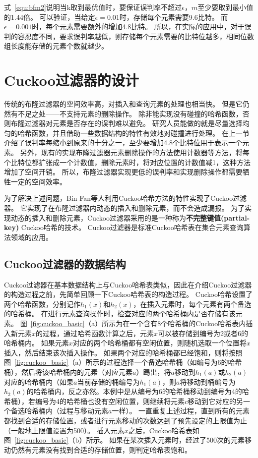 式~\ref{equ:bfm2}说明当k取到最优值时，要保证误判率不超过$\epsilon$，$m$至少要取到最小值的1.44倍。
可以验证，当给定$\epsilon = 0.01$时，存储每个元素需要9.6比特。
而$\epsilon = 0.001 $时，每个元素需要额外的增加4.8比特。
所以，在实际的应用中，对于误判的容忍度不同，要求误判率越低，则存储每个元素需要的比特位越多，相同位数组长度能存储的元素个数就越少。

\section{Cuckoo过滤器的设计}
\label{sec:cbf_para}
传统的布隆过滤器的空间效率高，对插入和查询元素的处理也相当快。
但是它仍然有不足之处——不支持元素的删除操作。
除非能实现没有碰撞的哈希函数，否则布隆过滤器对元素是否存在的误判难以避免。
研究人员能做的就是尽量选择均匀的哈希函数，并且借助一些数据结构的特性有效地对碰撞进行处理。
在上一节介绍了误判率每缩小到原来的十分之一，至少要增加4.8个比特位用于表示一个元素。
另外，现有的实现布隆过滤器元素删除操作的方法使用计数器等方法，将每个比特位都扩张成一个计数值，删除元素时，将对应位置的计数值减1，这种方法增加了空间开销。
所以，布隆过滤器实现更低的误判率和实现删除操作都需要牺牲一定的空间效率。

为了解决上述问题，Bin Fan等人利用Cuckoo哈希方法的特性实现了Cuckoo过滤器\cite{fan2014cuckoo}。
它实现了在布隆过滤器内动态的插入和删除元素，而不会造成漏报。
为了实现动态的插入和删除元素，Cuckoo过滤器采用的是一种称为\textbf{不完整键值(partial-key)} Cuckoo哈希的技术。
Cuckoo过滤器是标准Cuckoo哈希表在集合元素查询算法领域的应用。

\subsection{Cuckoo过滤器的数据结构}

Cuckoo过滤器在基本数据结构上与Cuckoo哈希表类似，因此在介绍Cuckoo过滤器的构造过程之前，先简单回顾一下Cuckoo哈希表的构造过程。
Cuckoo哈希设置了两个哈希函数，分别记作$h_1(x)$和$h_2(x)$，在插入元素时，每个元素有两个备选的哈希桶。
在进行元素查询操作时，检查对应的两个哈希桶内是否存储有该元素。
图~\ref{fig:cuckoo_basic}（a）所示为在一个含有8个哈希桶的Cuckoo哈希表内插入新元素$x$的过程，通过哈希函数计算之后，元素$x$可以被存储到编号为2或者6的哈希桶内。
如果元素$x$对应的两个哈希桶都有空闲位置，则随机选取一个位置将$x$插入，然后结束该次插入操作。
如果两个对应的哈希桶都已经饱和，则将按照图~\ref{fig:cuckoo_basic}（a）所示的过程选择一个备选哈希桶（如编号为6的哈希桶），然后将该哈希桶内的元素（对应元素$a$）踢出，将$a$移动到$h_1(a)$或$h_2(a)$对应的哈希桶内（如果$a$当前存储的桶编号为$h_1(a)$，则$a$将移动到桶编号为$h_2(a)$的哈希桶内，反之亦然。本例中是从编号为6的哈希桶移动到编号为4的哈希桶），若编号为4的哈希桶也没有空闲位置，则继续将元素$c$移动到它对应的另一个备选哈希桶内（过程与移动元素$a$一样）。
一直重复上述过程，直到所有的元素都找到合适的存储位置，或者进行元素移动的次数达到了预先设定的上限值为止（一般地上限值设置为500）。
插入元素$x$之后，Cuckoo哈希表如图~\ref{fig:cuckoo_basic}（b）所示。
如果在某次插入元素时，经过了500次的元素移动仍然有元素没有找到合适的存储位置，则判定哈希表饱和。

